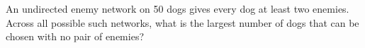 An undirected enemy network on 50 dogs gives every dog at least two enemies. Across all possible such networks, what is the largest number of dogs that can be chosen with no pair of enemies?
